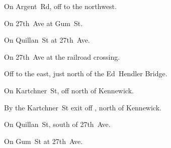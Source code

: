 
\begin{LocationList}

On Argent~Rd, off   to the northwest.

\Location{\GarageHQ \Garage}
On 27th~Ave at  Gum~St.

On Quillan~St at 27th~Ave.

On 27th~Ave at the railroad crossing.

Off  to the east, just north of the Ed~Hendler Bridge.

On Kartchner~St, off  north of Kennewick.

\Location{\TruckStop \Gas \Rest \Weigh}
By the Kartchner~St exit off , north of Kennewick.

On Quillan~St, south of 27th~Ave.

On  Gum~St at 27th~Ave.

\end{LocationList}
